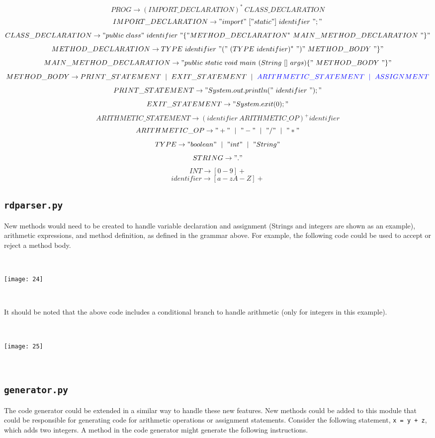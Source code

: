 \documentclass[11pt]{article}
\begin{document}
{\scriptsize 
$$ PROG \rightarrow (IMPORT\_DECLARATION)^{*} ~ CLASS\_DECLARATION$$
$$ IMPORT\_DECLARATION \rightarrow "import" ~["static"] ~identifier ~";" $$
$$ CLASS\_DECLARATION \rightarrow "public~class" ~ identifier~"\{"METHOD\_DECLARATION^{*} ~ MAIN\_METHOD\_DECLARATION~"\}" $$
{\color{blue} $$ METHOD\_DECLARATION \rightarrow TYPE ~ identifier ~ "(" ~ (TYPE ~ identifier)^{*} ~")" ~ METHOD\_BODY ~ "\}" $$}
$$ MAIN\_METHOD\_DECLARATION \rightarrow "public~static~void~main~(String~[]~args) \{"~METHOD\_BODY~"\}" $$
$$ METHOD\_BODY \rightarrow PRINT\_STATEMENT ~ \mid ~ EXIT\_STATEMENT ~ \mid ~ {\color{blue} ARITHMETIC\_STATEMENT ~ \mid ~ ASSIGNMENT}$$
$$ PRINT\_STATEMENT \rightarrow "System.out.println(" ~identifier~");" $$
$$ EXIT\_STATEMENT \rightarrow "System.exit(0);" $$
{\color{blue} $$ ARITHMETIC\_STATEMENT \rightarrow (identifier ~ ARITHMETIC\_OP)^{+} identifier $$ 
$$ ARITHMETIC\_OP \rightarrow "+" ~\mid~ "-" ~\mid~ "/" ~\mid~ "*" $$}
{\color{blue} $$ TYPE \rightarrow "boolean" ~\mid~ "int" ~\mid~ "String" $$
$$ STRING \rightarrow \\" . \\"  $$ 
$$ INT \rightarrow [0-9]+ $$}
$$ identifier \rightarrow [a-zA-Z]+ $$
}

\subsection{{\tt rdparser.py}}

New methods would need to be created to handle variable declaration and assignment (Strings and integers are shown as an example), arithmetic expressions, and method definition, as defined in the grammar above. For example, the following code could be used to accept or reject a method body.

~
\begin{center}
\texttt{[image: 24]}
\end{center}
~

It should be noted that the above code includes a conditional branch to handle arithmetic (only for integers in this example).

~
\begin{center}
\texttt{[image: 25]}
\end{center}
~

\subsection{{\tt generator.py}}

The code generator could be extended in a similar way to handle these new features. New methods could be added to this module that could be responsible for generating code for arithmetic operations or assignment statements. Consider the following statement, {\tt x = y + z}, which adds two integers. A method in the code generator might generate the following instructions.
\end{document}
